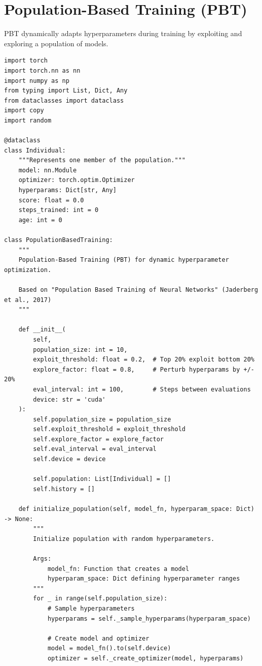\section{Population-Based Training (PBT)}

PBT dynamically adapts hyperparameters during training by exploiting and exploring a population of models.

\begin{lstlisting}[style=python, caption=Population-based training implementation]
import torch
import torch.nn as nn
import numpy as np
from typing import List, Dict, Any
from dataclasses import dataclass
import copy
import random

@dataclass
class Individual:
    """Represents one member of the population."""
    model: nn.Module
    optimizer: torch.optim.Optimizer
    hyperparams: Dict[str, Any]
    score: float = 0.0
    steps_trained: int = 0
    age: int = 0

class PopulationBasedTraining:
    """
    Population-Based Training (PBT) for dynamic hyperparameter optimization.

    Based on "Population Based Training of Neural Networks" (Jaderberg et al., 2017)
    """

    def __init__(
        self,
        population_size: int = 10,
        exploit_threshold: float = 0.2,  # Top 20% exploit bottom 20%
        explore_factor: float = 0.8,     # Perturb hyperparams by +/- 20%
        eval_interval: int = 100,        # Steps between evaluations
        device: str = 'cuda'
    ):
        self.population_size = population_size
        self.exploit_threshold = exploit_threshold
        self.explore_factor = explore_factor
        self.eval_interval = eval_interval
        self.device = device

        self.population: List[Individual] = []
        self.history = []

    def initialize_population(self, model_fn, hyperparam_space: Dict) -> None:
        """
        Initialize population with random hyperparameters.

        Args:
            model_fn: Function that creates a model
            hyperparam_space: Dict defining hyperparameter ranges
        """
        for _ in range(self.population_size):
            # Sample hyperparameters
            hyperparams = self._sample_hyperparams(hyperparam_space)

            # Create model and optimizer
            model = model_fn().to(self.device)
            optimizer = self._create_optimizer(model, hyperparams)


\end{lstlisting}

